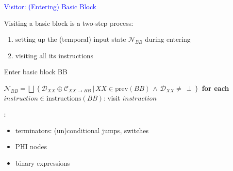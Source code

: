 \begin{frame}[fragile]{\textcolor{blue}{Visitor: (Entering) Basic Block}}

Visiting a basic block is a two-step process:
\begin{enumerate}
\item setting up the (temporal) input state $\mathcal{N}_{BB}$ during entering 
\item visiting all its instructions
\end{enumerate}

\begin{algorithm}[H]
\caption{Enter basic block BB}
\begin{algorithmic}[1]
\State $\mathcal{N}_{BB}= \bigsqcup \left\lbrace \mathcal{D}_{XX} \oplus \mathcal{C}_{XX\rightarrow BB} \,|\, XX \in \text{prev}(BB)\,\wedge\,\mathcal{D}_{XX}\neq\, \perp \right\rbrace$
\State \textbf{for each} $instruction \in \text{instructions}(BB)$:
\State \qquad visit $instruction$
\EndProcedure
\end{algorithmic}
\end{algorithm}
\underline{}:
\begin{itemize}
\item terminators: (un)conditional jumps, switches
\item PHI nodes
\item binary expressions
\end{itemize}
\end{frame}


